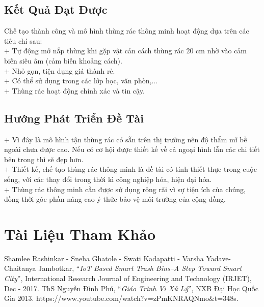 \documentclass[12pt,a4paper]{article}
\begin{document}
\subsection{Kết Quả Đạt Được}
\hspace{0.9cm} Chế tạo thành công và mô hình thùng rác thông minh hoạt động dựa trên các tiêu chí sau: \\
$+$ Tự động mở nắp thùng khi gặp vật cản cách thùng rác 20 cm nhờ vào cảm biến siêu âm (cảm biến khoảng cách).\\
$+$ Nhỏ gọn, tiện dụng giá thành rẻ.\\
$+$ Có thể sử dụng trong các lớp học, văn phòn,...\\
$+$ Thùng rác hoạt động chính xác và tin cậy.\\
\subsection{Hướng Phát Triển Đề Tài}
$+$ Vì đây là mô hình tận thùng rác có sẵn trên thị trường nên độ thẩm mĩ bề ngoài chưa được cao. Nếu có cơ hội được thiết kế về cả ngoại hình lẫn các chi tiết bên trong thì sẽ đẹp hơn.\\
$+$ Thiết kế, chế tạo thùng rác thông minh là đề tài có tính thiết thực trong cuộc sống, với các thay đổi trong thời kì công nghiệp hóa, hiện đại hóa.\\
$+$ Thùng rác thông minh cần được sử dụng rộng rãi vì sự tiện ích của chúng, đồng thời góc phần nâng cao ý thức bảo vệ môi trường của cộng đồng.\\
\newpage
\section{Tài Liệu Tham Khảo}
\begin{thebibliography}{9}
Shamlee Rashinkar - Sneha Ghatole - Swati Kadapatti - Varsha Yadave-
Chaitanya Jambotkar, “\textit{IoT Based Smart Trash Bins–A Step Toward Smart City}”, International Research Journal of Engineering and Technology (IRJET), Dec - 2017.
ThS Nguyễn Đình Phú, “\textit{Giáo Trình Vi Xử Lý}”, NXB Đại Học Quốc Gia 2013.
{https://www.youtube.com/watch?v=zPmKNRAQNmo&t=348s}.
\end{thebibliography}
\end{document}
